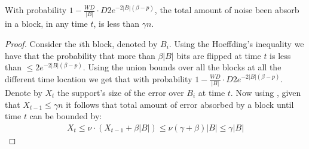 \documentclass[manuscript,screen,review]{acmart}
\begin{document}
\begin{claim}
  With probability $ 1 - \frac{WD}{|B|} \cdot D 2e^{-2|B|(\beta - p)} $, the total amount of noise been absorb in a block, in any time $t$, is less than $\gamma n$. 
\end{claim}
\begin{proof}
  Consider the $i$th block,  denoted by $B_{i}$. Using the Hoeffding's inequality we have that the probability that more than $\beta |B|$ bits are flipped at time $t$ is less than $ \le 2e^{-2|B|(\beta - p)} $. Using the union bounds over all the blocks at all the different time location we get that with probability $ 1 - \frac{WD}{|B|} \cdot D 2e^{-2|B|(\beta - p)} $. Denote by $X_{t}$ the support's size of the error over $B_{i}$ at time $t$. Now using , given that $X_{t-1} \le \gamma n$ it follows that total amount of error absorbed by a block until time $t$ can be bounded by: 
  \begin{equation*}
    \begin{split}
  X_{t} \le \nu \cdot (X_{t-1} + \beta |B| ) \le  \nu(\gamma+\beta) |B| \le \gamma |B|
    \end{split}
  \end{equation*}

\end{proof}






%
\printbibliography
\end{document}
